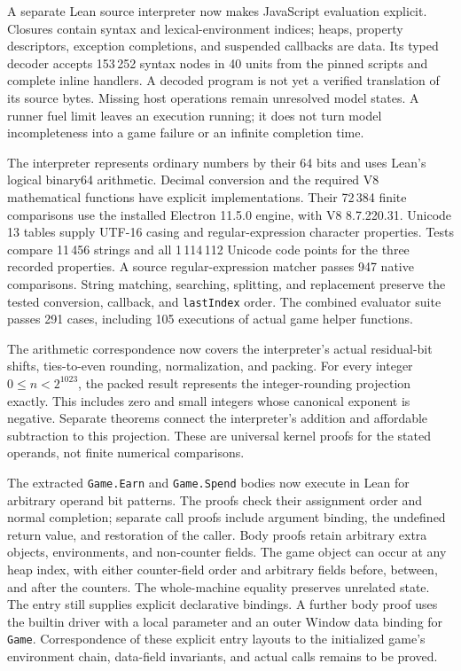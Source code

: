 \documentclass[11pt,a4paper]{article}
\numberwithin{equation}{section}
\theoremstyle{definition}
\theoremstyle{remark}
\begin{document}
A separate Lean source interpreter now makes JavaScript evaluation explicit. Closures contain syntax and lexical-environment indices; heaps, property descriptors, exception completions, and suspended callbacks are data. Its typed decoder accepts 153\,252 syntax nodes in 40 units from the pinned scripts and complete inline handlers. A decoded program is not yet a verified translation of its source bytes. Missing host operations remain unresolved model states. A runner fuel limit leaves an execution running; it does not turn model incompleteness into a game failure or an infinite completion time.

The interpreter represents ordinary numbers by their 64 bits and uses Lean's logical binary64 arithmetic. Decimal conversion and the required V8 mathematical functions have explicit implementations. Their 72\,384 finite comparisons use the installed Electron 11.5.0 engine, with V8 8.7.220.31. Unicode 13 tables supply UTF-16 casing and regular-expression character properties. Tests compare 11\,456 strings and all 1\,114\,112 Unicode code points for the three recorded properties. A source regular-expression matcher passes 947 native comparisons. String matching, searching, splitting, and replacement preserve the tested conversion, callback, and \texttt{lastIndex} order. The combined evaluator suite passes 291 cases, including 105 executions of actual game helper functions.

The arithmetic correspondence now covers the interpreter's actual residual-bit shifts, ties-to-even rounding, normalization, and packing. For every integer $0\leq n<2^{1023}$, the packed result represents the integer-rounding projection exactly. This includes zero and small integers whose canonical exponent is negative. Separate theorems connect the interpreter's addition and affordable subtraction to this projection. These are universal kernel proofs for the stated operands, not finite numerical comparisons.

The extracted \texttt{Game.Earn} and \texttt{Game.Spend} bodies now execute in Lean for arbitrary operand bit patterns. The proofs check their assignment order and normal completion; separate call proofs include argument binding, the undefined return value, and restoration of the caller. Body proofs retain arbitrary extra objects, environments, and non-counter fields. The game object can occur at any heap index, with either counter-field order and arbitrary fields before, between, and after the counters. The whole-machine equality preserves unrelated state. The entry still supplies explicit declarative bindings. A further body proof uses the builtin driver with a local parameter and an outer Window data binding for \texttt{Game}. Correspondence of these explicit entry layouts to the initialized game's environment chain, data-field invariants, and actual calls remains to be proved.
\end{document}
